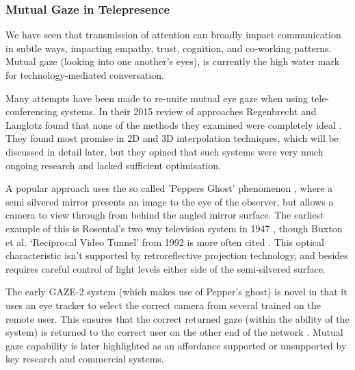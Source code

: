                    \subsubsection{Mutual Gaze in Telepresence}
          We have seen that transmission of attention can broadly impact communication in subtle ways, impacting empathy, trust, cognition, and co-working patterns. Mutual gaze (looking into one another's eyes), is currently the high water mark for technology-mediated conversation.\par
          Many attempts have been made to re-unite mutual eye gaze when using tele-conferencing systems. In their 2015 review of approaches Regenbrecht and Langlotz found that none of the methods they examined were completely ideal \cite{Regenbrecht2015}. They found most promise in 2D and 3D interpolation techniques, which will be discussed in detail later, but they opined that such systems were very much ongoing research and lacked sufficient optimisation.\par
          A popular approach uses the so called 'Peppers Ghost' phenomenon \cite{Steinmeyer2013}, where a semi silvered mirror presents an image to the eye of the observer, but allows a camera to view through from behind the angled mirror surface. The earliest example of this is Rosental's two way television system in 1947 \cite{Rosenthal1947}, though Buxton et al. `Reciprocal Video Tunnel' from 1992 is more often cited \cite{Buxton1992}. This optical characteristic isn't supported by retroreflective projection technology, and besides requires careful control of light levels either side of the semi-silvered surface.\par  
The early GAZE-2 system (which makes use of Pepper's ghost) is novel in that it uses an eye tracker to select the correct camera from several trained on the remote user. This ensures that the correct returned gaze (within the ability of the system) is returned to the correct user on the other end of the network \cite{Vertegaal2003}.
Mutual gaze capability is later highlighted as an affordance supported or unsupported by key research and commercial systems.                           


